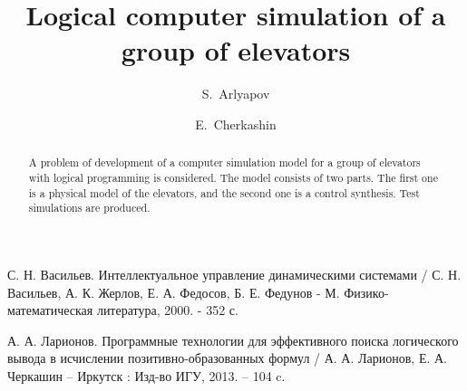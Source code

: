 \begin{thebibliography}{9}
 С. Н. Васильев. Интеллектуальное управление динамическими системами / С. Н. Васильев, А. К. Жерлов, Е. А. Федосов, Б. Е. Федунов - М. Физико-математическая литература, 2000. - 352 с.

 А. А. Ларионов. Программные технологии для эффективного поиска логического вывода в исчислении позитивно-образованных формул / А. А. Ларионов, Е. А. Черкашин – Иркутск : Изд-во ИГУ, 2013. – 104 c.
\end{thebibliography}

\begin{englishtitle}

\title{Logical computer simulation of a group of elevators}

\author{%
  S.~Arlyapov
  \and
  E.~Cherkashin
}


\maketitle
\begin{abstract}
A problem of development of a computer simulation model for a group of elevators with logical programming is considered.  The model consists of two parts. The first one is a physical model of the elevators, and the second one is a control synthesis.  Test simulations are produced.

\end{abstract}
\end{englishtitle}
